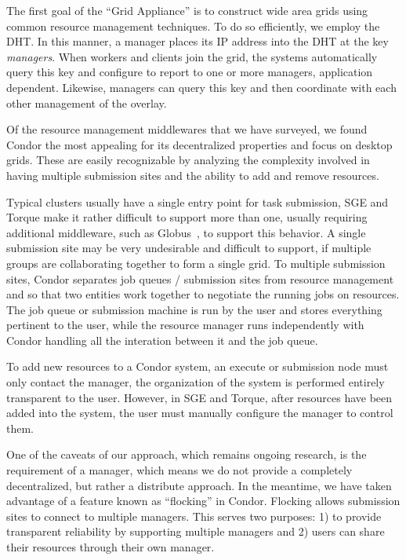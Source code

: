 \documentclass[conference]{IEEEtran}
\begin{document}
The first goal of the ``Grid Appliance'' is to construct wide area grids using
common resource management techniques.  To do so efficiently, we employ the
DHT.  In this manner, a manager places its IP address into the DHT at the key
\emph{managers}.  When workers and clients join the grid, the systems
automatically query this key and configure to report to one or more managers,
application dependent.  Likewise, managers can query this key and then
coordinate with each other management of the overlay.

Of the resource management middlewares that we have surveyed, we found Condor
the most appealing for its decentralized properties and focus on desktop grids.
These are easily recognizable by analyzing the complexity involved in having
multiple submission sites and the ability to add and remove resources.

Typical clusters usually have a single entry point for task submission, SGE and
Torque make it rather difficult to support more than one, usually requiring
additional middleware, such as Globus~\cite{globus}, to support this behavior.
A single submission site may be very undesirable and difficult to support, if
multiple groups are collaborating together to form a single grid.  To multiple
submission sites, Condor separates job queues / submission sites from resource
management and so that two entities work together to negotiate the running jobs
on resources.  The job queue or submission machine is run by the user and
stores everything pertinent to the user, while the resource manager runs
independently with Condor handling all the interation between it and the job
queue.

To add new resources to a Condor system, an execute or submission node must
only contact the manager, the organization of the system is performed entirely
transparent to the user.  However, in SGE and Torque, after resources have been
added into the system, the user must manually configure the manager to control
them.

One of the caveats of our approach, which remains ongoing research, is the
requirement of a manager, which means we do not provide a completely
decentralized, but rather a distribute approach.  In the meantime, we have
taken advantage of a feature known as ``flocking'' in Condor.  Flocking allows
submission sites to connect to multiple managers.  This serves two purposes: 1)
to provide transparent reliability by supporting multiple managers and 2) users
can share their resources through their own manager.
\end{document}

